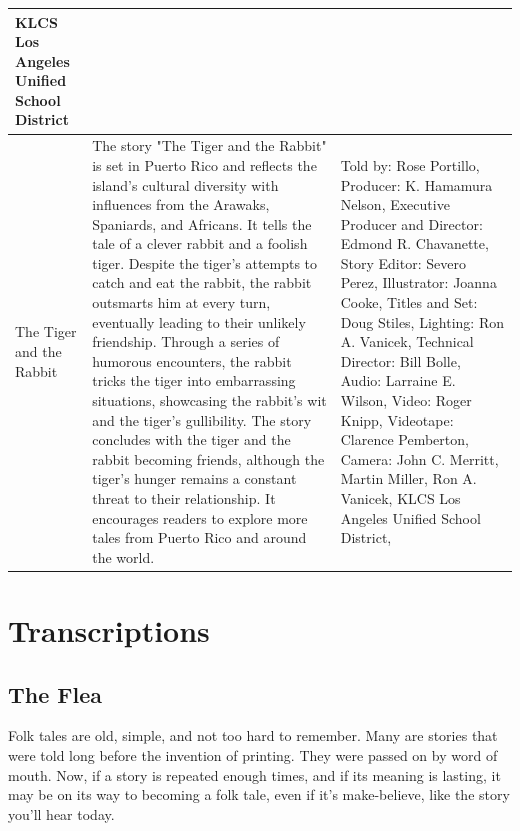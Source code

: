 \begin{table}[h]
\begin{small}
\begin{tabular}{|p{1.5cm}|p{8.5cm}|p{7cm}|}
            KLCS Los Angeles Unified School District
            \\
            \hline
            The Tiger and the Rabbit
                                 &
            The story "The Tiger and the Rabbit" is set in Puerto Rico and reflects the island's cultural diversity with influences from the Arawaks, Spaniards, and Africans.
            It tells the tale of a clever rabbit and a foolish tiger.
            Despite the tiger's attempts to catch and eat the rabbit, the rabbit outsmarts him at every turn, eventually leading to their unlikely friendship.
            Through a series of humorous encounters, the rabbit tricks the tiger into embarrassing situations, showcasing the rabbit's wit and the tiger's gullibility.
            The story concludes with the tiger and the rabbit becoming friends, although the tiger's hunger remains a constant threat to their relationship.
            It encourages readers to explore more tales from Puerto Rico and around the world.
                                 &
            Told by: Rose Portillo,
            Producer: K. Hamamura Nelson,
            Executive Producer and Director: Edmond R. Chavanette,
            Story Editor: Severo Perez,
            Illustrator: Joanna Cooke,
            Titles and Set: Doug Stiles,
            Lighting: Ron A. Vanicek,
            Technical Director: Bill Bolle,
            Audio: Larraine E. Wilson,
            Video: Roger Knipp,
            Videotape: Clarence Pemberton,
            Camera: John C. Merritt, Martin Miller, Ron A. Vanicek,
            KLCS Los Angeles Unified School District,
            \\
            \hline
        \end{tabular}
    \end{small}

\end{table}

\clearpage
\newpage

\section{Transcriptions}

\subsection{The Flea}
Folk tales are old, simple, and not too hard to remember. Many are stories that were told long before the invention of printing. They were passed on by word of mouth. Now, if a story is repeated enough times, and if its meaning is lasting, it may be on its way to becoming a folk tale, even if it's make-believe, like the story you'll hear today.

